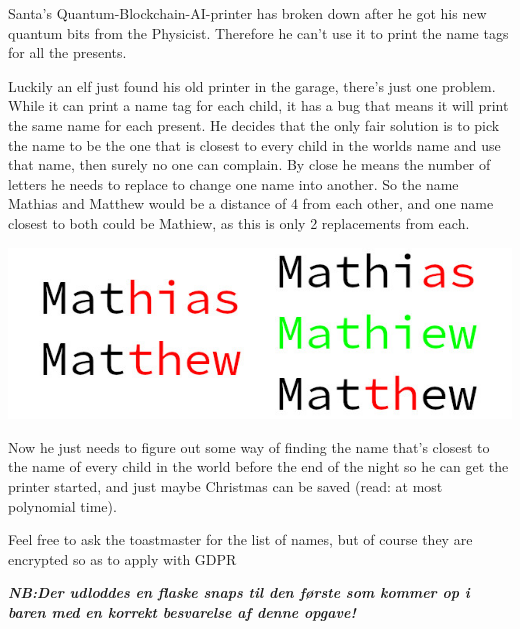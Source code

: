 Santa's Quantum-Blockchain-AI-printer has broken down after he got his new
quantum bits from the Physicist. Therefore he can't use it to print the name
tags for all the presents.

Luckily an elf just found his old printer in the garage,
there's just one problem. While it can print a name tag for each child, it has
a bug that means it will print the same name for each present. He decides that
the only fair solution is to pick the name to be the one that is closest to
every child in the worlds name and use that name, then surely no one can
complain. By close he means the number of letters he needs to replace to change
one name into another. So the name Mathias and Matthew would be a distance of 4
from each other, and one name closest to both could be Mathiew, as this is only
2 replacements from each.

\begin{center}
\includegraphics[width=.9\textwidth]{figures/mathias.jpg}
\end{center}

Now he just needs to figure out some way of finding
the name that's closest to the name of every child in the world before the end
of the night so he can get the printer started, and just maybe Christmas can be
saved (read: at most polynomial time).

Feel free to ask the toastmaster for the list of names, but of course they are encrypted so as to apply with GDPR

\vspace{0.5em}\textbf{\emph{NB:\@ Der udloddes en flaske snaps til den første som kommer op i
baren med en korrekt besvarelse af denne opgave!}}
